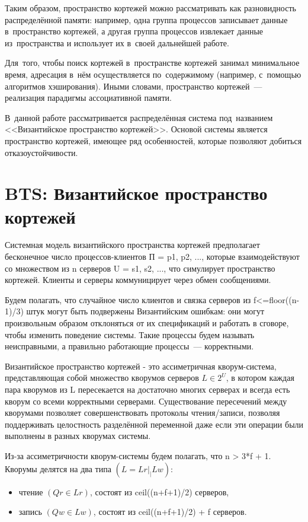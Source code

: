 Таким образом, пространство кортежей можно рассматривать как разновидность распределённой памяти: например, одна группа процессов записывает данные в~пространство кортежей, а другая группа процессов извлекает данные из~пространства и использует их в~своей дальнейшей работе.

Для~того, чтобы поиск кортежей в~пространстве кортежей занимал минимальное время, адресация в~нём осуществляется по~содержимому (например, с~помощью алгоритмов хэширования). Иными словами, пространство кортежей~--- реализация парадигмы ассоциативной памяти.

В~данной работе рассматривается распределённая система под~названием <<Византийское пространство кортежей>>. Основой системы является пространство кортежей, имеющее ряд особенностей, которые позволяют добиться отказоустойчивости.

\section{BTS: Византийское пространство кортежей}\label{sec:5}
Системная модель византийского пространства кортежей предполагает бесконечное число процессов-клиентов П = {p1, p2, ...}, которые взаимодействуют со множеством из n серверов U = {s1, s2, ...}, что симулирует пространство кортежей. Клиенты и серверы коммуницирует через обмен сообщениями.

Будем полагать, что случайное число клиентов и связка серверов из f<=floor((n-1)/3) штук могут быть подвержены Византийским ошибкам: они могут произвольным образом отклоняться от их спецификаций и работать в сговоре, чтобы изменить поведение системы. Такие процессы будем называть неисправными, а правильно работающие процессы~--- корректными.

Византийское пространство кортежей - это ассиметричная кворум-система, представляющая собой множество кворумов серверов $L \in 2^U$, в котором каждая пара кворумов из L пересекается на достаточно многих серверах и всегда есть кворум со всеми корректными серверами. Существование пересечений между кворумами позволяет совершенствовать протоколы чтения/записи, позволяя поддерживать целостность разделённой переменной даже если эти операции были выполнены в разных кворумах системы.

Из-за ассиметричности кворум-системы будем полагать, что  n > 3*f + 1. Кворумы делятся на два типа $(L = Lr |_| Lw)$:
\begin{itemize}
	\item чтение $(Qr \in Lr)$, состоят из ceil((n+f+1)/2) серверов,
	\item запись $(Qw \in Lw)$, состоят из ceil((n+f+1)/2) + f серверов.
\end{itemize}

